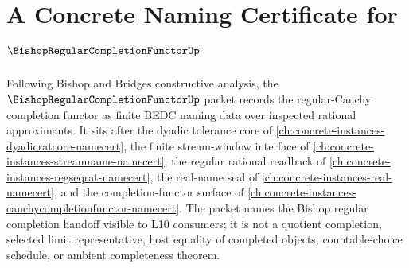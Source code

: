 \chapter{A Concrete Naming Certificate for $\BishopRegularCompletionFunctorUp$}
\label{ch:concrete-instances-bishop-regular-completion-functor-namecert}

Following Bishop and Bridges constructive analysis, the $\BishopRegularCompletionFunctorUp$ packet records the regular-Cauchy completion functor as finite BEDC naming data over inspected rational approximants. It sits after the dyadic tolerance core of \autoref{ch:concrete-instances-dyadicratcore-namecert}, the finite stream-window interface of \autoref{ch:concrete-instances-streamname-namecert}, the regular rational readback of \autoref{ch:concrete-instances-regseqrat-namecert}, the real-name seal of \autoref{ch:concrete-instances-real-namecert}, and the completion-functor surface of \autoref{ch:concrete-instances-cauchycompletionfunctor-namecert}. The packet names the Bishop regular completion handoff visible to L10 consumers; it is not a quotient completion, selected limit representative, host equality of completed objects, countable-choice schedule, or ambient completeness theorem.

